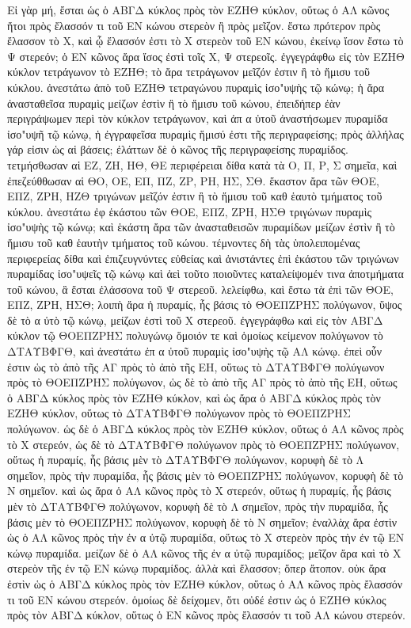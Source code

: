 \begin{Parallel}{}{}
{{\greekfont Εἰ γὰρ μή, ἔσται ὡς ὁ ΑΒΓΔ κύκλος πρὸς τὸν ΕΖΗΘ κύκλον,
οὕτως ὁ ΑΛ κῶνος ἤτοι πρὸς ἔλασσόν τι τοῦ ΕΝ κώνου
στερεὸν ἢ πρὸς μεῖζον. ἔστω πρότερον πρὸς ἔλασσον
τὸ Χ, καὶ ᾧ ἔλασσόν ἐστι τὸ Χ στερεὸν τοῦ ΕΝ κώνου,
ἐκείνῳ ἴσον ἔστω τὸ Ψ στερεόν; ὁ ΕΝ κῶνος ἄρα ἴσος
ἐστὶ τοῖς Χ, Ψ στερεοῖς. ἐγγεγράφθω εἰς τὸν ΕΖΗΘ κύκλον
τετράγωνον τὸ ΕΖΗΘ; τὸ ἄρα τετράγωνον μεῖζόν ἐστιν ἢ τὸ
ἥμισυ τοῦ κύκλου. ἀνεστάτω ἀπὸ τοῦ ΕΖΗΘ τετραγώνου
πυραμὶς ἰσο"υψὴς τῷ κώνῳ; ἡ ἄρα ἀνασταθεῖσα πυραμὶς μείζων
ἐστὶν ἢ τὸ ἥμισυ τοῦ κώνου, ἐπειδήπερ ἐὰν περιγράψωμεν
περὶ τὸν κύκλον τετράγωνον, καὶ ἀπ α ὐτοῦ ἀναστήσωμεν
πυραμίδα ἰσο"υψῆ τῷ κώνῳ, ἡ ἐγγραφεῖσα πυραμὶς
ἥμισύ ἐστι τῆς περιγραφείσης; πρὸς ἀλλήλας γάρ εἰσιν ὡς αἱ
βάσεις; ἐλάττων δὲ ὁ κῶνος τῆς περιγραφείσης πυραμίδος.
τετμήσθωσαν αἱ ΕΖ, ΖΗ, ΗΘ, ΘΕ περιφέρειαι δίθα κατὰ τὰ Ο, Π, Ρ, Σ
σημεῖα, καὶ ἐπεζεύθθωσαν αἱ ΘΟ, ΟΕ, ΕΠ, ΠΖ, ΖΡ, ΡΗ, ΗΣ, ΣΘ.
ἕκαστον ἄρα τῶν ΘΟΕ, ΕΠΖ, ΖΡΗ, ΗΖΘ τριγώνων μεῖζόν
ἐστιν ἢ τὸ ἥμισυ τοῦ καθ ἑαυτὸ τμήματος τοῦ κύκλου.
ἀνεστάτω ἐφ ἑκάστου τῶν ΘΟΕ, ΕΠΖ, ΖΡΗ, ΗΣΘ
τριγώνων πυραμὶς ἰσο"υψὴς τῷ κώνῳ; 
καὶ ἑκάστη ἄρα τῶν ἀνασταθεισῶν πυραμίδων μείζων ἐστὶν ἢ τὸ ἥμισυ τοῦ
καθ ἑαυτὴν τμήματος τοῦ κώνου. τέμνοντες δὴ τὰς ὑπολειπομένας
περιφερείας δίθα καὶ ἐπιζευγνύντες εὐθείας καὶ ἀνιστάντες
ἐπὶ ἑκάστου τῶν τριγώνων πυραμίδας ἰσο"υψεῖς τῷ κώνῳ
καὶ ἀεὶ τοῦτο ποιοῦντες καταλείψομέν τινα ἀποτμήματα τοῦ
κώνου, ἃ ἔσται ἐλάσσονα τοῦ Ψ στερεοῦ. 
λελείφθω, καὶ ἔστω τὰ ἐπὶ τῶν ΘΟΕ, ΕΠΖ, ΖΡΗ, ΗΣΘ; 
λοιπὴ ἄρα ἡ πυραμίς, ἧς βάσις τὸ ΘΟΕΠΖΡΗΣ πολύγωνον, ὕψος δὲ τὸ α ὐτὸ τῷ
κώνῳ, μείζων ἐστὶ τοῦ Χ στερεοῦ.
 ἐγγεγράφθω καὶ εἰς τὸν ΑΒΓΔ κύκλον τῷ ΘΟΕΠΖΡΗΣ πολυγώνῳ ὅμοιόν τε καὶ
ὁμοίως κείμενον πολύγωνον τὸ ΔΤΑΥΒΦΓΘ, καὶ ἀνεστάτω ἐπ
α ὐτοῦ πυραμὶς ἰσο"υψὴς τῷ ΑΛ κώνῳ. 
ἐπεὶ οὖν ἐστιν ὡς τὸ ἀπὸ τῆς ΑΓ πρὸς τὸ ἀπὸ τῆς ΕΗ, οὕτως τὸ
ΔΤΑΥΒΦΓΘ πολύγωνον πρὸς τὸ ΘΟΕΠΖΡΗΣ
πολύγωνον, ὡς δὲ τὸ ἀπὸ τῆς ΑΓ πρὸς τὸ ἀπὸ τῆς ΕΗ, οὕτως
ὁ ΑΒΓΔ κύκλος πρὸς τὸν ΕΖΗΘ κύκλον,
 καὶ ὡς ἄρα ὁ ΑΒΓΔ κύκλος πρὸς τὸν ΕΖΗΘ κύκλον, οὕτως τὸ
 ΔΤΑΥΒΦΓΘ πολύγωνον πρὸς τὸ ΘΟΕΠΖΡΗΣ πολύγωνον. 
 ὡς δὲ ὁ ΑΒΓΔ κύκλος πρὸς τὸν ΕΖΗΘ κύκλον, οὕτως ὁ ΑΛ
 κῶνος πρὸς τὸ Χ στερεόν, 
 ὡς δὲ τὸ ΔΤΑΥΒΦΓΘ πολύγωνον πρὸς τὸ ΘΟΕΠΖΡΗΣ πολύγωνον, 
 οὕτως ἡ πυραμίς, ἧς βάσις μὲν τὸ
 ΔΤΑΥΒΦΓΘ πολύγωνον, κορυφὴ δὲ τὸ Λ σημεῖον, πρὸς τὴν πυραμίδα,
 ἧς βάσις μὲν τὸ
 ΘΟΕΠΖΡΗΣ πολύγωνον, κορυφὴ δὲ τὸ Ν σημεῖον. καὶ ὡς ἄρα ὁ
 ΑΛ κῶνος πρὸς τὸ Χ 
 στερεόν,  οὕτως ἡ πυραμίς, ἧς βάσις μὲν τὸ ΔΤΑΥΒΦΓΘ πολύγωνον,
κορυφὴ δὲ τὸ Λ σημεῖον, πρὸς τὴν πυραμίδα, ἧς βάσις μὲν τὸ
ΘΟΕΠΖΡΗΣ πολύγωνον, κορυφὴ δὲ τὸ Ν σημεῖον; ἐναλλὰχ
ἄρα ἐστὶν ὡς ὁ ΑΛ κῶνος πρὸς τὴν ἐν α ὐτῷ
πυραμίδα, οὕτως τὸ Χ στερεὸν πρὸς τὴν ἐν τῷ ΕΝ κώνῳ
πυραμίδα. μείζων δὲ ὁ ΑΛ κῶνος τῆς ἐν α ὐτῷ πυραμίδος;
μεῖζον ἄρα καὶ τὸ Χ στερεὸν τῆς ἐν τῷ ΕΝ κώνῳ πυραμίδος.
ἀλλὰ καὶ ἔλασσον; ὅπερ ἄτοπον. οὐκ ἄρα ἐστὶν ὡς ὁ ΑΒΓΔ
κύκλος πρὸς τὸν ΕΖΗΘ κύκλον, οὕτως ὁ ΑΛ κῶνος πρὸς ἔλασσόν τι
τοῦ ΕΝ κώνου στερεόν. ὁμοίως δὲ δείχομεν, ὅτι οὐδέ
ἐστιν ὡς ὁ ΕΖΗΘ κύκλος πρὸς τὸν ΑΒΓΔ κύκλον, οὕτως
ὁ ΕΝ κῶνος πρὸς ἔλασσόν τι τοῦ ΑΛ κώνου στερεόν.}

}
\end{Parallel}
